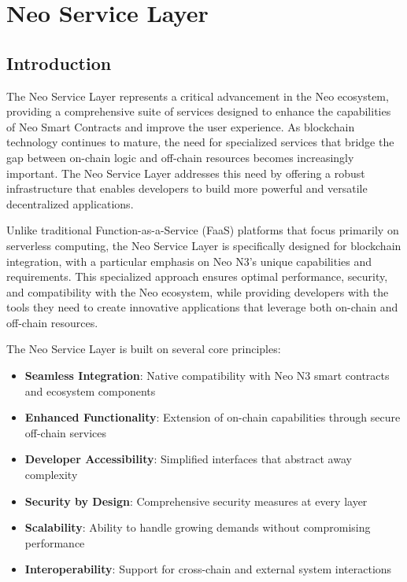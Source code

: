\section{Neo Service Layer}
\label{sec:neo-service-layer}

\subsection{Introduction}
\label{subsec:nsl-intro}

The Neo Service Layer represents a critical advancement in the Neo ecosystem, providing a comprehensive suite of services designed to enhance the capabilities of Neo Smart Contracts and improve the user experience. As blockchain technology continues to mature, the need for specialized services that bridge the gap between on-chain logic and off-chain resources becomes increasingly important. The Neo Service Layer addresses this need by offering a robust infrastructure that enables developers to build more powerful and versatile decentralized applications.

Unlike traditional Function-as-a-Service (FaaS) platforms that focus primarily on serverless computing, the Neo Service Layer is specifically designed for blockchain integration, with a particular emphasis on Neo N3's unique capabilities and requirements. This specialized approach ensures optimal performance, security, and compatibility with the Neo ecosystem, while providing developers with the tools they need to create innovative applications that leverage both on-chain and off-chain resources.

The Neo Service Layer is built on several core principles:

\begin{itemize}
    \item \textbf{Seamless Integration}: Native compatibility with Neo N3 smart contracts and ecosystem components
    \item \textbf{Enhanced Functionality}: Extension of on-chain capabilities through secure off-chain services
    \item \textbf{Developer Accessibility}: Simplified interfaces that abstract away complexity
    \item \textbf{Security by Design}: Comprehensive security measures at every layer
    \item \textbf{Scalability}: Ability to handle growing demands without compromising performance
    \item \textbf{Interoperability}: Support for cross-chain and external system interactions
\end{itemize}

